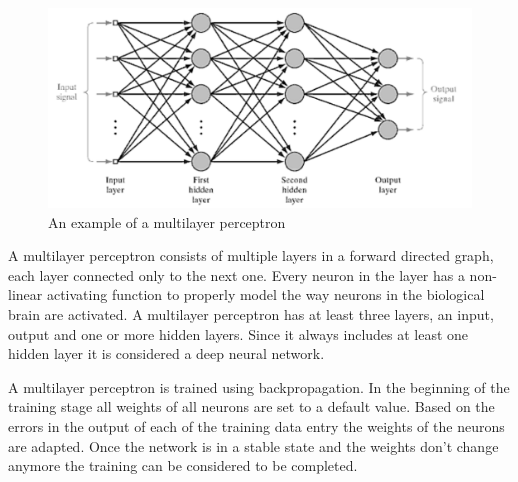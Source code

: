 \begin{figure}[!ht]
	\centering
	\includegraphics[width=1.0\textwidth]{images/multilayer-perceptron}
	\caption{An example of a multilayer perceptron \cite{MultilayerPerceptron}}
	\label{fig:multilayer-perceptron}
\end{figure}

A multilayer perceptron consists of multiple layers in a forward directed graph, each layer connected only to the next one. Every neuron in the layer has a non-linear activating function to properly model the way neurons in the biological brain are activated. A multilayer perceptron has at least three layers, an input, output and one or more hidden layers. Since it always includes at least one hidden layer it is considered a deep neural network. \cite{DataMining}

A multilayer perceptron is trained using backpropagation. In the beginning of the training stage all weights of all neurons are set to a default value. Based on the errors in the output of each of the training data entry the weights of the neurons are adapted. Once the network is in a stable state and the weights don't change anymore the training can be considered to be completed. \cite{DataMining}
